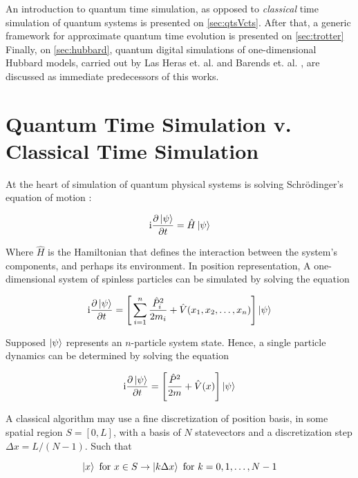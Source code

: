An introduction to quantum time simulation, as opposed to \textit{classical} time simulation of quantum systems is presented on \autoref{sec:qtsVcts}. After that, a generic framework for approximate quantum time evolution is presented on \autoref{sec:trotter} Finally, on \autoref{sec:hubbard}, quantum digital simulations of one-dimensional Hubbard models, carried out by Las Heras et. al. \cite{HubbardSimulLasHeras} and Barends et. al. \cite{HubbardSimul}, are discussed as immediate predecessors of this works.

\section{Quantum Time Simulation v. Classical Time Simulation}
\label{sec:qtsVcts}

  At the heart of simulation of quantum physical systems is solving Schrödinger's equation of motion \cite{Beck, Nielsen}:

  \begin{equation}
  \mathrm{i}
  \label{eq:SchEqn}\pdv{\ket{\psi}}{t} = \hat{H} \ket{\psi}
  \end{equation}

  Where $\hat{H}$ is the Hamiltonian that defines the interaction between the system's components, and perhaps its environment. In position representation, A one-dimensional system of spinless particles can be simulated by solving the equation

  \begin{equation}
  \mathrm{i}\pdv{\ket{\psi}}{t} = \Bigg[\sum_{i = 1}^{n} \frac{\hat{P}_i^2}{2m_i} + \hat{V}(x_1, x_2, \ldots, x_n)\Bigg] \ket{\psi}
  \end{equation}

  Supposed $\ket{\psi}$ represents an $n$-particle system state. Hence, a single particle dynamics can be determined by solving the equation

  \begin{equation}
  \mathrm{i}\pdv{\ket{\psi}}{t} = \Bigg[\frac{\hat{P}^2}{2m} + \hat{V}(x)\Bigg] \ket{\psi}
  \end{equation}

  A classical algorithm may use a fine discretization of position basis, in some spatial region $\mathit{S} = [0,L]$, with a basis of $N$ statevectors and a discretization step $\Delta x = L/(N-1)$. Such that

  \begin{equation}
    \ket{x} \text{ for } x \in S \rightarrow \ket{k \Delta x} \text{ for } k = 0,1,\ldots,N-1
  \end{equation}

